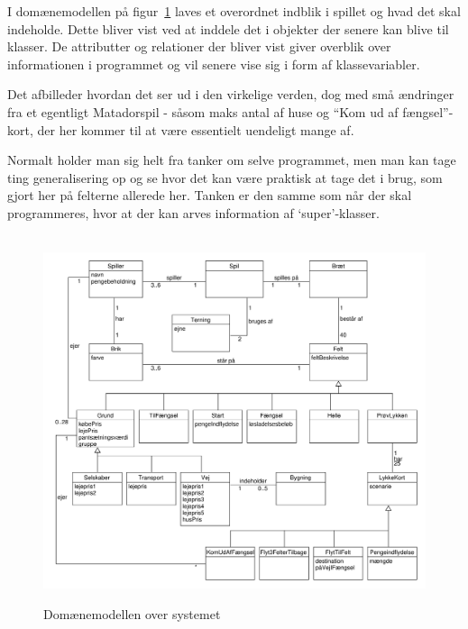 \documentclass[class=article, crop=false]{standalone}
\begin{document}
     I domænemodellen på figur~\ref{fig:domain_model} laves et overordnet indblik i spillet og hvad det skal indeholde. Dette bliver vist ved at inddele det i objekter der senere kan blive til klasser. De attributter og relationer der bliver vist giver overblik over informationen i programmet og vil senere vise sig i form af klassevariabler. \par
    Det afbilleder hvordan det ser ud i den virkelige verden, dog med små ændringer fra et egentligt Matadorspil - såsom maks antal af huse og “Kom ud af fængsel”-kort, der her kommer til at være essentielt uendeligt mange af. \par
    Normalt holder man sig helt fra tanker om selve programmet, men man kan tage ting generalisering op og se hvor det kan være praktisk at tage det i brug, som gjort her på felterne allerede her. Tanken er den samme som når der skal programmeres, hvor at der kan arves information af ‘super’-klasser.


    \begin{figure}[H]

                \hbox{\hspace{-1cm} \includegraphics[scale=0.6]{diagrams/domain_model.pdf}}

                \caption{Domænemodellen over systemet}\label{fig:domain_model}
            \end{figure}
\end{document}
